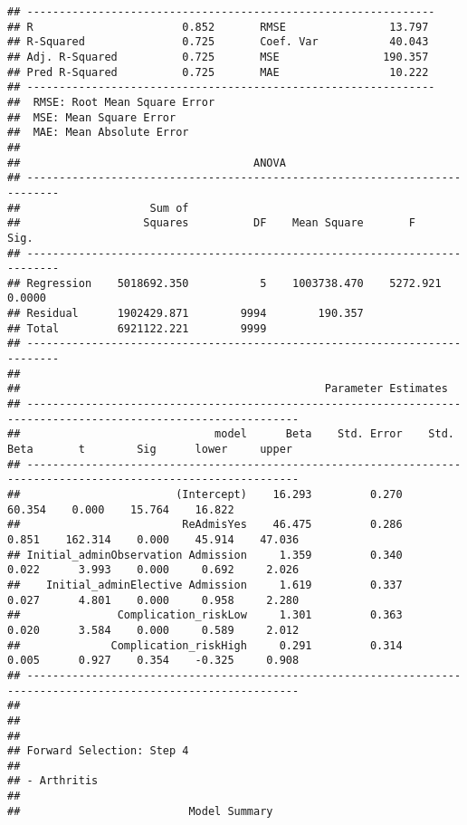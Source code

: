 \documentclass[
]{article}
\begin{document}
\begin{verbatim}
## ---------------------------------------------------------------
## R                       0.852       RMSE                13.797 
## R-Squared               0.725       Coef. Var           40.043 
## Adj. R-Squared          0.725       MSE                190.357 
## Pred R-Squared          0.725       MAE                 10.222 
## ---------------------------------------------------------------
##  RMSE: Root Mean Square Error 
##  MSE: Mean Square Error 
##  MAE: Mean Absolute Error 
## 
##                                    ANOVA                                    
## ---------------------------------------------------------------------------
##                    Sum of                                                  
##                   Squares          DF    Mean Square       F          Sig. 
## ---------------------------------------------------------------------------
## Regression    5018692.350           5    1003738.470    5272.921    0.0000 
## Residual      1902429.871        9994        190.357                       
## Total         6921122.221        9999                                      
## ---------------------------------------------------------------------------
## 
##                                               Parameter Estimates                                                
## ----------------------------------------------------------------------------------------------------------------
##                              model      Beta    Std. Error    Std. Beta       t        Sig      lower     upper 
## ----------------------------------------------------------------------------------------------------------------
##                        (Intercept)    16.293         0.270                  60.354    0.000    15.764    16.822 
##                         ReAdmisYes    46.475         0.286        0.851    162.314    0.000    45.914    47.036 
## Initial_adminObservation Admission     1.359         0.340        0.022      3.993    0.000     0.692     2.026 
##    Initial_adminElective Admission     1.619         0.337        0.027      4.801    0.000     0.958     2.280 
##               Complication_riskLow     1.301         0.363        0.020      3.584    0.000     0.589     2.012 
##              Complication_riskHigh     0.291         0.314        0.005      0.927    0.354    -0.325     0.908 
## ----------------------------------------------------------------------------------------------------------------
## 
## 
## 
## Forward Selection: Step 4 
## 
## - Arthritis 
## 
##                          Model Summary                          

\end{verbatim}
\end{document}
